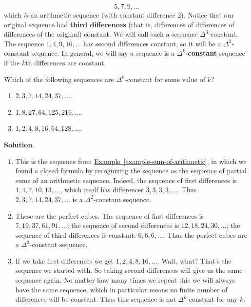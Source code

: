 \documentclass[11pt,]{book}
\newcommand{\terminology}[1]{\textbf{#1}}
\theoremstyle{ptxplainnotitle}
\theoremstyle{ptxplaintitle}
\theoremstyle{ptxdefinitionnotitle}
\theoremstyle{ptxdefinitiontitle}
\theoremstyle{ptxdefinitionnotitle}
\theoremstyle{ptxdefinitiontitle}
\theoremstyle{ptxdefinitionnotitle}
\theoremstyle{ptxdefinitiontitle}
\theoremstyle{ptxdefinitiontitlenonumber}
\theoremstyle{ptxdefinitiontitlenonumber}
\numberwithin{equation}{chapter}
\begin{document}
\begin{equation*}
5, 7, 9, \ldots
\end{equation*}
which \emph{is} an arithmetic sequence (with constant difference 2). Notice that our original sequence had \terminology{third differences} (that is, differences of differences of differences of the original) constant. We will call such a sequence \(\Delta^3\)-constant. The sequence \(1, 4, 9, 16, \ldots\) has second differences constant, so it will be a \(\Delta^2\)-constant sequence. In general, we will say a sequence is a \terminology{\(\Delta^k\)-constant}\label{notation-4}
 sequence if the \(k\)th differences are constant.%
\begin{example}\label{example-deltak}
\hypertarget{p-365}{}%
Which of the following sequences are \(\Delta^k\)-constant for some value of \(k\)? \leavevmode%
\begin{enumerate}
\item\hypertarget{li-205}{}\(2, 3, 7, 14, 24, 37,\ldots\).%
\item\hypertarget{li-206}{}\(1, 8, 27, 64, 125, 216, \ldots\).%
\item\hypertarget{li-207}{}\(1,2,4,8,16,64,128,\ldots\).%
\end{enumerate}
%
\par\smallskip%
\noindent\textbf{Solution}.\hypertarget{solution-43}{}\quad%
\hypertarget{p-366}{}%
\leavevmode%
\begin{enumerate}
\item\hypertarget{li-208}{}This is the sequence from \hyperref[example-sum-of-arithmetic]{Example~\ref{example-sum-of-arithmetic}}, in which we found a closed formula by recognizing the sequence as the sequence of partial sums of an arithmetic sequence. Indeed, the sequence of first differences is \(1,4,7, 10, 13,\ldots\), which itself has differences \(3,3,3,3,\ldots\). Thus \(2, 3, 7, 14, 24, 37,\ldots\) is a \(\Delta^2\)-constant sequence.%
\item\hypertarget{li-209}{}These are the perfect cubes. The sequence of first differences is \(7, 19, 37, 61, 91, \ldots\); the sequence of second differences is \(12, 18, 24, 30,\ldots\); the sequence of third differences is constant: \(6,6,6,\ldots\). Thus the perfect cubes are a \(\Delta^3\)-constant sequence.%
\item\hypertarget{li-210}{}If we take first differences we get \(1,2,4,8,16,\ldots\). Wait, what? That's the sequence we started with. So taking second differences will give us the same sequence again. No matter how many times we repeat this we will always have the same sequence, which in particular means no finite number of differences will be constant. Thus this sequence is not \(\Delta^k\)-constant for any \(k\).%
\end{enumerate}
%
\end{example}
\end{document}
